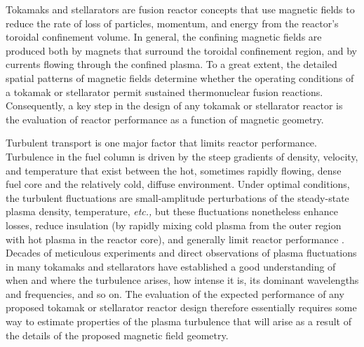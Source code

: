 \documentclass{jpp}
\begin{document}
Tokamaks and stellarators
are fusion reactor concepts that use magnetic fields to reduce the rate of loss of particles, momentum, and energy from the reactor's toroidal confinement volume. %
In general, the confining magnetic fields are produced both by magnets that surround the toroidal confinement region, and by currents flowing through the confined plasma. To a great extent, the detailed spatial patterns of magnetic fields determine whether the operating conditions of a tokamak or stellarator permit  sustained thermonuclear fusion reactions. Consequently, a key step in the design of any tokamak or stellarator reactor is the evaluation of reactor performance as a function of magnetic geometry. 

Turbulent transport is one major factor that limits reactor performance. Turbulence in the fuel column is driven by the steep gradients of density, velocity, and temperature that exist between the hot, sometimes rapidly flowing, dense fuel core and the relatively cold, diffuse environment. Under optimal conditions, the turbulent fluctuations are small-amplitude perturbations of the steady-state plasma density, temperature, {\it etc.,} but these fluctuations nonetheless enhance losses, reduce insulation (by rapidly mixing cold plasma from the outer region with hot plasma in the reactor core), and generally limit reactor performance \citep{Abel2008}. Decades of meticulous experiments and direct observations of plasma fluctuations in many tokamaks and stellarators have established a good understanding of when and where the turbulence arises, how intense it is, its dominant wavelengths and frequencies, and so on. The evaluation of the expected performance of any proposed tokamak or stellarator reactor design therefore essentially requires some way to estimate properties of the plasma turbulence that will arise as a result of the details of the proposed magnetic field geometry. 
\end{document}
